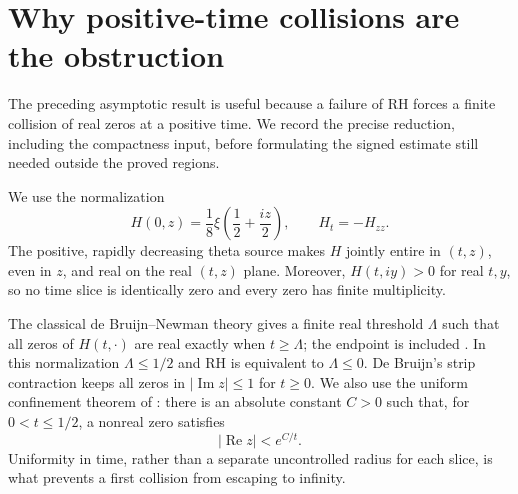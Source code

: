 \documentclass[11pt]{article}
\numberwithin{equation}{section}
\theoremstyle{definition}
\theoremstyle{remark}
\begin{document}
\section{Why positive-time collisions are the obstruction}
\label{sec:fc-collision}

The preceding asymptotic result is useful because a failure of RH forces
a finite collision of real zeros at a positive time.  We record the
precise reduction, including the compactness input, before formulating
the signed estimate still needed outside the proved regions.

We use the normalization
\[
 H(0,z)=\frac18\xi\!\left(\frac12+\frac{iz}{2}\right),
 \qquad H_t=-H_{zz}.
\]
The positive, rapidly decreasing theta source makes $H$ jointly entire
in $(t,z)$, even in $z$, and real on the real $(t,z)$ plane.  Moreover,
$H(t,iy)>0$ for real $t,y$, so no time slice is identically zero and
every zero has finite multiplicity.

The classical de Bruijn--Newman theory gives a finite real threshold
$\Lambda$ such that all zeros of $H(t,\cdot)$ are real exactly when
$t\ge\Lambda$; the endpoint is included
\cite{debruijn,newman}.  In this normalization $\Lambda\le1/2$ and
RH is equivalent to $\Lambda\le0$.  De Bruijn's strip contraction
keeps all zeros in $|\operatorname{Im}z|\le1$ for $t\ge0$.
We also use the uniform confinement theorem of
\cite[Theorem 1.5(i)]{polymath}: there is an absolute constant $C>0$
such that, for $0<t\le1/2$, a nonreal zero satisfies
\begin{equation}
 |\operatorname{Re}z|<e^{C/t}.
 \label{fc:uniform-confinement}
\end{equation}
Uniformity in time, rather than a separate uncontrolled radius for
each slice, is what prevents a first collision from escaping to infinity.
\end{document}
